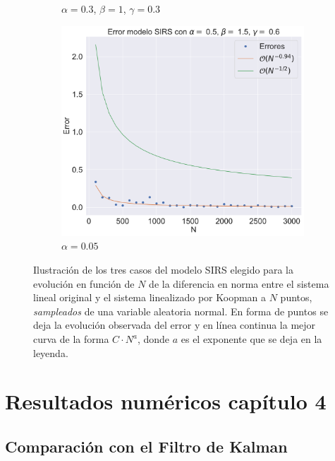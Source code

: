 \begin{figure}[h]
\begin{subfigure}[b]{0.32\textwidth}
        \caption{$\alpha=0.3$, $\beta=1$, $\gamma=0.3$}
    \end{subfigure}
    \hfill
    \begin{subfigure}[b]{0.32\textwidth}
        \centering
        \includegraphics[width=\textwidth]{img/content/chapter3/SIRS3Errors.pdf}
        \caption{$\alpha=0.05$}
    \end{subfigure}
    \caption{Ilustración de los tres casos del modelo SIRS elegido para la evolución en función de $N$ de la diferencia en norma entre el sistema lineal original y el sistema linealizado por Koopman a $N$ puntos,  \textit{sampleados} de una variable aleatoria normal. En forma de puntos se deja la evolución observada del error y en línea continua la mejor curva de la forma $C \cdot N^{a}$, donde $a$ es el exponente que se deja en la leyenda.}
    \label{fig:ErrorSIRS}
\end{figure}


\chapter{Resultados numéricos capítulo 4}

\section{Comparación con el Filtro de Kalman}

